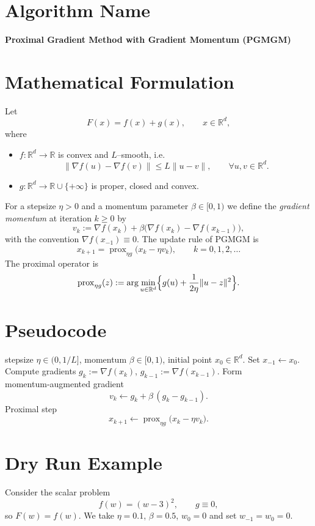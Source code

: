 \documentclass{article}
\newcommand{\prox}{\operatorname{prox}}
\newcommand{\R}{\mathbb{R}}
\begin{document}
\section*{Algorithm Name}
\textbf{Proximal Gradient Method with Gradient Momentum (PGMGM)}

\section*{Mathematical Formulation}
Let 
\[
F(x)=f(x)+g(x),\qquad x\in\R^{d},
\]
where  

\begin{itemize}
    \item $f:\R^{d}\!\to\!\R$ is convex and $L$–smooth, i.e. 
    \[
    \|\nabla f(u)-\nabla f(v)\|\le L\|u-v\|,\qquad\forall u,v\in\R^{d}.
    \]
    \item $g:\R^{d}\!\to\!\R\cup\{+\infty\}$ is proper, closed and convex.
\end{itemize}

For a stepsize $\eta>0$ and a momentum parameter $\beta\in[0,1)$ we define the \emph{gradient momentum} at iteration $k\ge0$ by  
\[
v_{k}:=\nabla f(x_{k})+\beta\bigl(\nabla f(x_{k})-\nabla f(x_{k-1})\bigr),
\]
with the convention $\nabla f(x_{-1})\equiv 0$.  
The update rule of PGMGM is
\[
\boxed{\;
x_{k+1}= \prox_{\eta g}\bigl(x_{k}-\eta v_{k}\bigr),\qquad k=0,1,2,\dots
\;}
\tag{1}
\]
The proximal operator is
\[
\prox_{\eta g}(z):=\arg\min_{u\in\R^{d}}\Bigl\{ g(u)+\frac{1}{2\eta}\|u-z\|^{2}\Bigr\}.
\]

\section*{Pseudocode}
\begin{algorithm}[H]
\caption{PGMGM}
\begin{algorithmic}[1]
\Require stepsize $\eta\in(0,1/L]$, momentum $\beta\in[0,1)$, initial point $x_{0}\in\R^{d}$.
\State Set $x_{-1}\gets x_{0}$.
    \State Compute gradients $g_{k}:=\nabla f(x_{k})$, $g_{k-1}:=\nabla f(x_{k-1})$.
    \State Form momentum‑augmented gradient 
    \[
    v_{k}\gets g_{k}+\beta\,(g_{k}-g_{k-1}) .
    \]
    \State Proximal step
    \[
    x_{k+1}\gets \prox_{\eta g}\bigl(x_{k}-\eta v_{k}\bigr).
    \]
\EndFor
\end{algorithmic}
\end{algorithm}

\section*{Dry Run Example}
Consider the scalar problem
\[
f(w)=(w-3)^{2},\qquad g\equiv0,
\]
so $F(w)=f(w)$.  
We take $\eta=0.1$, $\beta=0.5$, $w_{0}=0$ and set $w_{-1}=w_{0}=0$.
\end{document}
